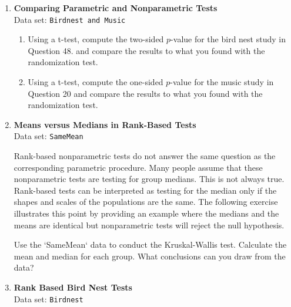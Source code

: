 \documentclass[
]{book}
\begin{document}
\begin{enumerate}
\begin{enumerate}
    \item Should the data be analyzed as match pairs or be treated as if there were two independent
samples?
    \item Use appropriate graphics and summary statistics to describe the difference in brain volume for
affected and unaffected twins.
    \item Use the appropriate permutation test to ascertain if the difference in brain volume described in
Part B is the result of schizophrenia or if it could be explained as a chance difference. Report
your $p$-value and summarize your conclusion.
  \end{enumerate}
  
  
  \item \textbf{Comparing Parametric and Nonparametric Tests} \\
  Data set: \texttt{Birdnest and Music}
  \begin{enumerate}
      
    \item Using a t-test, compute the two-sided $p$-value for the bird nest study in Question 48. and compare the results to what you found with the randomization test.
    \item Using a t-test, compute the one-sided $p$-value for the music study in Question 20 and compare the
results to what you found with the randomization test.
  \end{enumerate}
  
  
  
  
  \item \textbf{Means versus Medians in Rank-Based Tests} \\
  Data set: \texttt{SameMean}
  
  Rank-based nonparametric tests do not answer the same question as the corresponding parametric procedure. Many people assume that these nonparametric tests are testing for group medians. This is not always true. Rank-based tests can be interpreted as testing for the median only if the shapes and scales of the populations are the same. The following exercise illustrates this point by providing an example where the medians and the means are identical but nonparametric tests will reject the null hypothesis.

Use the `SameMean` data to conduct the Kruskal-Wallis test. Calculate the mean and median for each group. What conclusions can you draw from the data?
  
  
  
  
  \item \textbf{Rank Based Bird Nest Tests} \\
  Data set: \texttt{Birdnest}
  \begin{enumerate}
      

\end{enumerate}
\end{enumerate}
\end{document}
